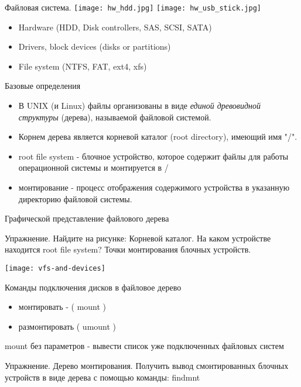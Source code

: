 \begin{frame}{Файловая система.}
\texttt{[image: hw\_hdd.jpg]} 
\texttt{[image: hw\_usb\_stick.jpg]} 
  \begin{itemize}
    \item Hardware (HDD, Disk controllers, SAS, SCSI, SATA)
    \item Drivers, block devices (disks or partitions)
    \item File system (NTFS, FAT, ext4, xfs)
  \end{itemize}
\end{frame}

\begin{frame}{Базовые определения}
  \begin{itemize}
    \item В UNIX (и Linux) файлы организованы в виде \emph{единой древовидной структуры} (дерева), называемой \alert{файловой системой}.
    \item Корнем дерева является \alert{корневой каталог} (root directory), имеющий имя \alert{"/"}.
    \item \alert{root file system} - блочное устройство, которое содержит файлы для работы операционной системы и монтируется в /
    \item \alert{монтирование} - процесс отображения содержимого устройства в указанную директорию файловой системы.
  \end{itemize}
\end{frame}
\begin{frame}{Графической представление файлового дерева}
      \begin{block}{Упражнение. Найдите на рисунке:}
	      Корневой каталог.  На каком устройстве находится root file system?
	      Точки монтирования блочных устройств.
      \end{block}
  \texttt{[image: vfs-and-devices]}
\end{frame}

\begin{frame}{Команды подключения дисков в файловое дерево}
      \begin{itemize}
        \item монтировать - ( \alert{mount} ) 
        \item размонтировать ( \alert{umount} )
      \end{itemize}
   \alert{mount} без параметров - вывести список уже подключенных файловых систем
      \begin{block}{Упражнение. Дерево монтирования.}
     Получить вывод смонтированных блочных устройств в виде дерева с помощью команды: \alert{findmnt}
      \end{block}
\end{frame}

